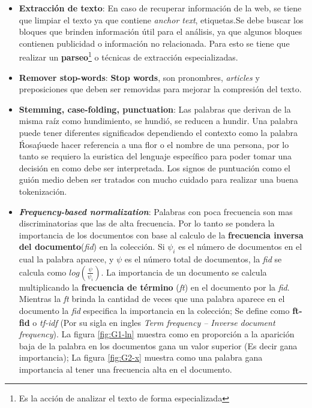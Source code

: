 \begin{itemize}

	\item \textbf{Extracción de texto}: En caso de recuperar información de la web, se tiene que limpiar el texto ya que contiene \textit{anchor text}, etiquetas.Se debe buscar los bloques que brinden información útil para el análisis, ya que algunos bloques contienen publicidad o información no relacionada. Para esto se tiene que realizar un \textbf{parseo}\footnote{Es la acción de analizar el texto de forma especializada} o técnicas de extracción especializadas.

	\item \textbf{Remover stop-words}: \textbf{Stop words}, son pronombres, \textit{articles} y preposiciones que deben ser removidas para mejorar la compresión del texto.

	\item  \textbf{Stemming, case-folding, punctuation}: Las palabras que derivan de la misma raíz como hundimiento, se hundió, se reducen a hundir. Una palabra puede tener diferentes significados dependiendo el contexto como la palabra \'Rosa\' puede hacer referencia a una flor o el nombre de una persona, por lo tanto se requiero la euristica del lenguaje específico para poder tomar una decisión en como debe ser interpretada. Los signos de puntuación como el guión medio deben ser tratados con mucho cuidado para realizar una buena tokenización.

	\item \textbf{\textit{Frequency-based normalization}}: Palabras con poca frecuencia son mas discriminatorias que las de alta frecuencia. Por lo tanto se pondera la importancia de los documentos con base al calculo de la \textbf{frecuencia inversa del documento}(\textit{fid}) en la colección. Si $\psi_i$ es el número de documentos en el cual la palabra aparece, y $\psi$ es el número total de documentos, la \textit{fid} se calcula como $log(\frac{\psi}{\psi_i})$. La importancia de un documento se calcula multiplicando la \textbf{frecuencia de término} (\textit{ft}) en el documento por la \textit{fid}. Mientras la \textit{ft} brinda la cantidad de veces  que una palabra aparece en el documento la \textit{fid} especifica la importancia en la colección; Se define como \textbf{ft-fid} o \textit{tf-idf} (Por su sigla en ingles \textit{Term frequency – Inverse document frequency}). La figura \ref{fig:G1-ln} muestra como en proporción a la aparición baja de la palabra  en los documentos gana un valor superior (Es decir gana importancia); La figura \ref{fig:G2-x} muestra como una palabra gana importancia al tener una frecuencia alta en el documento.


\end{itemize}
